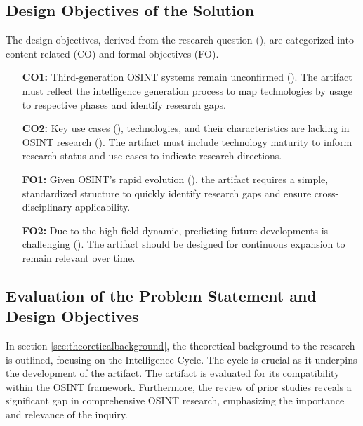 \documentclass[10pt]{article}
\begin{document}
\subsection{Design Objectives of the Solution} \label{sec:designobjectives}


The design objectives, derived from the research question (\cite{Peffers.2007}), are categorized into content-related (CO) and formal objectives (FO).

\begin{itemize}
    \item[\textbf{CO1:}] Third-generation OSINT systems remain unconfirmed (\cite{Ghioni.2023}). The artifact must reflect the intelligence generation process to map technologies by usage to respective phases and identify research gaps.
    \item[\textbf{CO2:}] Key use cases (\cite{AlKilani.2021, Dokman.2020, Ghioni.2023}), technologies, and their characteristics are lacking in OSINT research (\cite{Ghioni.2023,Ish.2022}). The artifact must include technology maturity to inform research status and use cases to indicate research directions.
    \item[\textbf{FO1:}] Given OSINT's rapid evolution (\cite{Ghioni.2023}), the artifact requires a simple, standardized structure to quickly identify research gaps and ensure cross-disciplinary applicability.
    \item[\textbf{FO2:}] Due to the high field dynamic, predicting future developments is challenging (\cite{Benes.2013}). The artifact should be designed for continuous expansion to remain relevant over time.
\end{itemize}

\subsection{Evaluation of the Problem Statement and Design Objectives} \label{sec:eval}
In section \ref{sec:theoreticalbackground}, the theoretical background to the research is outlined, focusing on the Intelligence Cycle. The cycle is crucial as it underpins the development of the artifact. The artifact is evaluated for its compatibility within the OSINT framework. Furthermore, the review of prior studies reveals a significant gap in comprehensive OSINT research, emphasizing the importance and relevance of the inquiry.
\end{document}
